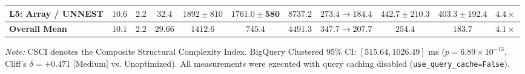 \documentclass[10pt,a4paper]{article}
\begin{document}
\begin{table}[t!]
{\begin{tabular}{@{}lcccccccccc@{}}
\textbf{L5: Array / UNNEST} & $10.6$ & $2.2$ & $32.4$ & $1892 \pm 810$ & $\mathbf{1761.0 \pm 580}$ & $8737.2$ & $273.4 \rightarrow 184.4$ & $442.7 \pm 210.3$ & $\mathbf{403.3 \pm 192.4}$ & $4.4\times$ \\
\midrule
\textbf{Overall Mean} & $\mathbf{10.1}$ & $\mathbf{2.2}$ & $\mathbf{29.66}$ & $\mathbf{1412.6}$ & $\mathbf{745.4}$ & $\mathbf{4491.3}$ & $\mathbf{347.7 \rightarrow 207.7}$ & $\mathbf{254.4}$ & $\mathbf{183.7}$ & $\mathbf{4.1\times}$ \\
\bottomrule
\end{tabular}%
}
\vspace{2pt}
\parbox{\textwidth}{\scriptsize \textit{Note:} CSCI denotes the Composite Structural Complexity Index. BigQuery Clustered 95\% CI: $[515.64, 1026.49]\text{ ms}$ ($p = 6.89 \times 10^{-13}$, Cliff's $\delta = +0.471\text{ [Medium]}$ vs. Unoptimized). All measurements were executed with query caching disabled (\texttt{use\_query\_cache=False}).}
\end{table}
\end{document}
